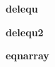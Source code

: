 \documentclass{article}
\begin{document}
\textbf{delequ}



\textbf{delequ2}


\textbf{eqnarray}

\end{document}

